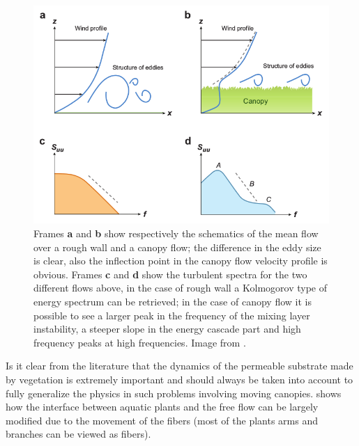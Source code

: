 \begin{figure}[h]
	\centering
	\includegraphics[width=0.7\linewidth]{chapter_1/spectra}
	\caption{Frames \textbf{a} and \textbf{b} show respectively the schematics of the mean flow over a rough wall and a canopy flow; the difference in the eddy size is clear, also the inflection point in the canopy flow velocity profile is obvious.
		Frames \textbf{c} and \textbf{d} show the turbulent spectra for the two different flows above, in the case of rough wall a Kolmogorov type of energy spectrum can be retrieved; in the case of canopy flow it is possible to see  a larger peak in the frequency of the mixing layer instability, a steeper slope in the energy cascade part and high frequency peaks at high frequencies. Image from \citet{de2008effects}.}
		\label{fig:spectra}
	\end{figure}

Is it clear from the literature that the dynamics of the permeable substrate made by vegetation is extremely important and should always be taken into account to fully generalize the physics in such problems involving moving canopies. \citet{nepf2012flow} shows how the interface between aquatic plants and the free flow can be largely modified due to the movement of the fibers (most of the plants arms and branches can be viewed as fibers).


